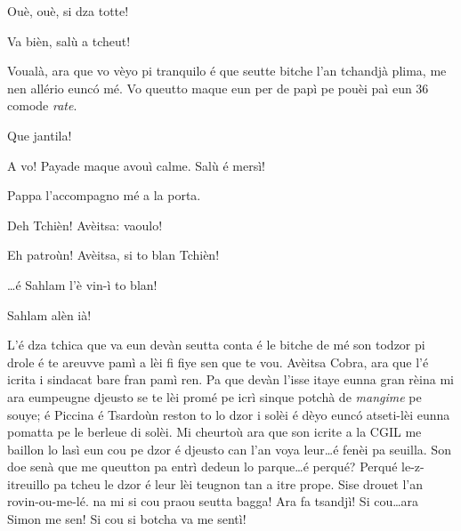 \begin{drama}
\Cienspeaks Ouè, ouè, si dza totte!

\Trincherospeaks Va bièn, salù a tcheut!


\Chefspeaks Voualà, ara que vo vèyo pi tranquilo é que seutte bitche l’an tchandjà plima, me nen allério eunc\'o mé. Vo queutto ma\-que eun per de papì pe pouèi paì eun 36 comode \textit{rate}.

\Cienspeaks Que jantila!


\Cienspeaks A vo! Payade maque avouì calme. Salù é mersì!

\Simonspeaks Pappa l’accompagno mé a la porta.


\Cienspeaks Deh Tchièn! Avèitsa: vaoulo!


\Sahlammspeaks Eh patroùn! Avèitsa, si to blan Tchièn! 

\Mariettospeaks \ldots é Sahlam l'è vin-ì to blan! 


\Mariettospeaks Sahlam alèn ià!





\scene[-- La morale]


\Cienspeaks {} L’é dza tchica que va eun devàn seutta conta é le bitche de mé son todzor pi drole é te areuvve pamì a lèi fi fiye sen que te vou. Avèitsa Cobra, ara que l’é icrita i sindacat bare fran pamì ren. Pa que devàn l’isse itaye eunna gran rèina mi ara eumpeugne djeusto se te lèi promé pe icrì sinque potchà de \textit{mangime} pe souye; é Piccina é Tsardoùn reston to lo dzor i solèi é dèyo eunc\'o atseti-lèi eunna pomatta pe le berleue di solèi. Mi cheurtoù ara que son icrite a la CGIL me baillon lo lasì eun cou pe dzor é djeusto can l’an voya leur\ldots é fenèi pa seuilla. Son doe senà que me queutton pa entrì dedeun lo parque\ldots é perqué? Perqué le-z-itreuillo pa tcheu le dzor é leur lèi teugnon tan a itre prope.  Sise drouet l’an rovin-ou-me-lé.  na mi si cou praou seutta bagga!  Ara fa tsandjì! Si cou\ldots ara Simon me sen! Si cou si botcha va me sentì!


\end{drama}
